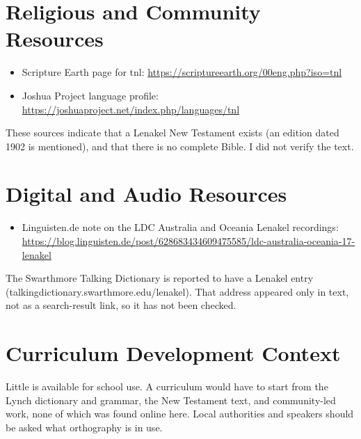 \documentclass[12pt]{article}
\begin{document}
\section{Religious and Community Resources}
\begin{itemize}
\item Scripture Earth page for tnl: \url{https://scriptureearth.org/00eng.php?iso=tnl}
\item Joshua Project language profile: \url{https://joshuaproject.net/index.php/languages/tnl}
\end{itemize}
These sources indicate that a Lenakel New Testament exists (an edition dated 1902 is mentioned), and that there is no complete Bible. I did not verify the text.

\section{Digital and Audio Resources}
\begin{itemize}
\item Linguisten.de note on the LDC Australia and Oceania Lenakel recordings: \url{https://blog.linguisten.de/post/628683434609475585/ldc-australia-oceania-17-lenakel}
\end{itemize}
The Swarthmore Talking Dictionary is reported to have a Lenakel entry (talkingdictionary.swarthmore.edu/lenakel). That address appeared only in text, not as a search-result link, so it has not been checked.

\section{Curriculum Development Context}
Little is available for school use. A curriculum would have to start from the Lynch dictionary and grammar, the New Testament text, and community-led work, none of which was found online here. Local authorities and speakers should be asked what orthography is in use.
\end{document}
